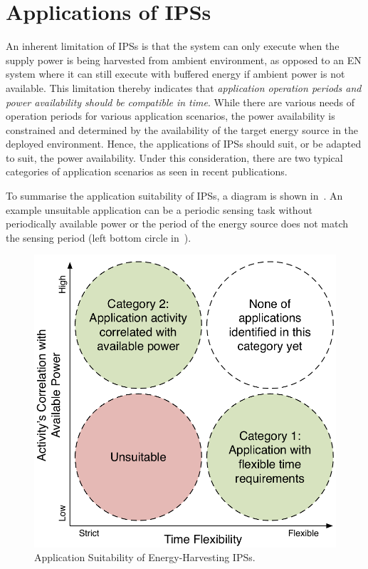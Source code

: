 
\section{Applications of IPSs}

An inherent limitation of IPSs is that the system can only execute when the supply power is being  harvested from ambient environment, as opposed to an EN system where it can still execute with buffered energy if ambient power is not available. 
This limitation thereby indicates that \textit{application operation periods and power availability should be compatible in time}. 
While there are various needs of operation periods for various application scenarios, the power availability is constrained and determined by the availability of the target energy source in the deployed environment. 
Hence, the applications of IPSs should suit, or be adapted to suit, the power availability. 
Under this consideration, there are two typical categories of application scenarios as seen in recent publications. 

To summarise the application suitability of IPSs, a diagram is shown in~. 
An example unsuitable application can be a periodic sensing task without periodically available power or the period of the energy source does not match the sensing period (left bottom circle in~).

\begin{figure}
    \centering
    \includegraphics[width=0.8\columnwidth]{ch1_intro/figures/appsuit2}
    \caption{Application Suitability of Energy-Harvesting IPSs.}
    \label{fig:appsuit}
\end{figure}


